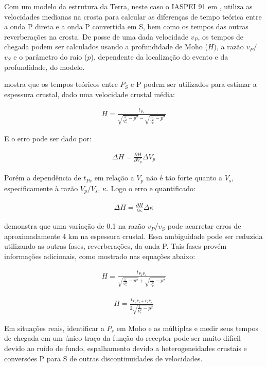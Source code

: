 Com um modelo da estrutura da Terra, neste caso o IASPEI 91 em \cite{kennet_iaspei_1991}, utiliza as velocidades medianas na crosta para calcular as diferenças de tempo teórica entre a onda P direta e a onda P convertida em S, bem como os tempos das outras reverberações na crosta. De posse de uma dada velocidade $v_{P}$, os tempos de chegada podem ser calculados usando a profundidade de Moho ($H$), a razão $v_{P}$/$v_{S}$ e o parâmetro do raio ($p$), dependente da localização do evento e da profundidade, do modelo.

\cite{Zhu_Kanamori_2000} mostra que os tempos teóricos entre $P_{S}$ e P podem ser utilizados para estimar a espessura crustal, dado uma velocidade crustal média:

\begin{eqnarray}
H = {\frac{t_{P_{s}}}{{\sqrt{\frac{1}{V_{s}^{2}} - p^{2}}} - \sqrt{\frac{1}{V_{p}^{2}} - p^{2}}}}
\end{eqnarray}

E o erro pode ser dado por:

\begin{eqnarray}
\Delta H = \frac{\partial H}{\partial V_{p}} \Delta V_{p}
\end{eqnarray}

Porém a dependência de $t_{Ps}$ em relação a $V_{p}$ não é tão forte quanto a $V_{s}$, especificamente à razão $V_{p}/V_{s}$, $\kappa$. Logo o erro e quantificado:

\begin{eqnarray}
\Delta H = \frac{\partial H}{\partial \kappa } \Delta \kappa 
\end{eqnarray}

\cite{Zhu_Kanamori_2000} demonstra que uma variação de 0.1 na razão $v_{P}$/$v_{S}$ pode acarretar erros de aproximadamente 4 km na espessura crustal. Essa ambiguidade pode ser reduzida utilizando as outras fases, reverberações, da onda P. Tais fases provém informações adicionais, como mostrado nas equações abaixo:

\begin{eqnarray}
H = {\frac{t_{P_{p}P_{s}}}{{\sqrt{\frac{1}{V_{s}^{2}} - p^{2}}} + \sqrt{\frac{1}{V_{p}^{2}} - p^{2}}}}
\end{eqnarray}

\begin{eqnarray}
H = \frac{t_{P_{p}P_{s}+P_{s}P_{s}}}{{2\sqrt{\frac{1}{V_{s}^{2}}- p^{2}}}}
\end{eqnarray}

Em situações reais, identificar a $P_{s}$ em Moho e as múltiplas e medir seus tempos de chegada em um único traço da função do receptor pode ser muito difícil devido ao ruído de fundo, espalhamento devido a heterogeneidades crustais e conversões P para S de outras discontinuidades de velocidades.

